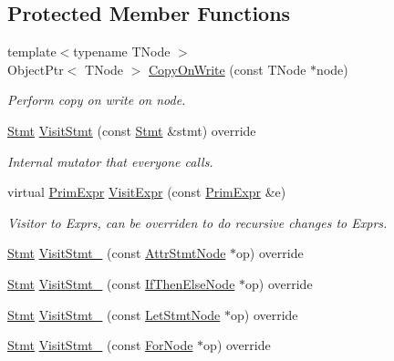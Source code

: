 \subsection*{Protected Member Functions}
\begin{DoxyCompactItemize}
\item 
{\footnotesize template$<$typename T\+Node $>$ }\\Object\+Ptr$<$ T\+Node $>$ \hyperlink{classtvm_1_1tir_1_1StmtMutator_a8dfe0e96ba9d3b4cd08e57c20c1eb414}{Copy\+On\+Write} (const T\+Node $\ast$node)
\begin{DoxyCompactList}\small\item\em Perform copy on write on node. \end{DoxyCompactList}\item 
\hyperlink{classtvm_1_1tir_1_1Stmt}{Stmt} \hyperlink{classtvm_1_1tir_1_1StmtMutator_a4306d1beba05fa1ac582503498a6d7ce}{Visit\+Stmt} (const \hyperlink{classtvm_1_1tir_1_1Stmt}{Stmt} \&stmt) override
\begin{DoxyCompactList}\small\item\em Internal mutator that everyone calls. \end{DoxyCompactList}\item 
virtual \hyperlink{classtvm_1_1PrimExpr}{Prim\+Expr} \hyperlink{classtvm_1_1tir_1_1StmtMutator_ad7864f64476c846a8023fdba1188b74e}{Visit\+Expr} (const \hyperlink{classtvm_1_1PrimExpr}{Prim\+Expr} \&e)
\begin{DoxyCompactList}\small\item\em Visitor to Exprs, can be overriden to do recursive changes to Exprs. \end{DoxyCompactList}\item 
\hyperlink{classtvm_1_1tir_1_1Stmt}{Stmt} \hyperlink{classtvm_1_1tir_1_1StmtMutator_ac22f8d85fc78d756b8e11e53eb1bf2df}{Visit\+Stmt\+\_\+} (const \hyperlink{classtvm_1_1tir_1_1AttrStmtNode}{Attr\+Stmt\+Node} $\ast$op) override
\item 
\hyperlink{classtvm_1_1tir_1_1Stmt}{Stmt} \hyperlink{classtvm_1_1tir_1_1StmtMutator_a7bc8fad1381862ce012819bd4762a1b6}{Visit\+Stmt\+\_\+} (const \hyperlink{classtvm_1_1tir_1_1IfThenElseNode}{If\+Then\+Else\+Node} $\ast$op) override
\item 
\hyperlink{classtvm_1_1tir_1_1Stmt}{Stmt} \hyperlink{classtvm_1_1tir_1_1StmtMutator_a51d66e88ec3779c117bab5ba9406091c}{Visit\+Stmt\+\_\+} (const \hyperlink{classtvm_1_1tir_1_1LetStmtNode}{Let\+Stmt\+Node} $\ast$op) override
\item 
\hyperlink{classtvm_1_1tir_1_1Stmt}{Stmt} \hyperlink{classtvm_1_1tir_1_1StmtMutator_afad3009a7d05a345ca868a980f58b9ca}{Visit\+Stmt\+\_\+} (const \hyperlink{classtvm_1_1tir_1_1ForNode}{For\+Node} $\ast$op) override

\end{DoxyCompactItemize}
